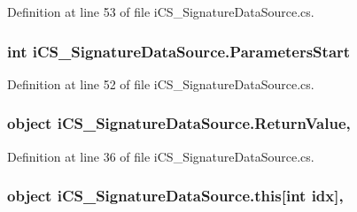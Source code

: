 Definition at line 53 of file i\+C\+S\+\_\+\+Signature\+Data\+Source.\+cs.

\hypertarget{classi_c_s___signature_data_source_a6a966657131abc59eea5c3d78625abd3}{
\subsubsection[{Parameters\+Start}]{\setlength{\rightskip}{0pt plus 5cm}int i\+C\+S\+\_\+\+Signature\+Data\+Source.\+Parameters\+Start\hspace{0.3cm}{\ttfamily [get]}}}\label{classi_c_s___signature_data_source_a6a966657131abc59eea5c3d78625abd3}


Definition at line 52 of file i\+C\+S\+\_\+\+Signature\+Data\+Source.\+cs.

\hypertarget{classi_c_s___signature_data_source_a7bfc30f7572a67fee813e2e4f779a41f}{
\subsubsection[{Return\+Value}]{\setlength{\rightskip}{0pt plus 5cm}object i\+C\+S\+\_\+\+Signature\+Data\+Source.\+Return\+Value\hspace{0.3cm}{\ttfamily [get]}, {\ttfamily [set]}}}\label{classi_c_s___signature_data_source_a7bfc30f7572a67fee813e2e4f779a41f}


Definition at line 36 of file i\+C\+S\+\_\+\+Signature\+Data\+Source.\+cs.

\hypertarget{classi_c_s___signature_data_source_a5f9ac11fb491603b4e1947467f5d1bae}{
\subsubsection[{this[int idx]}]{\setlength{\rightskip}{0pt plus 5cm}object i\+C\+S\+\_\+\+Signature\+Data\+Source.\+this\mbox{[}int idx\mbox{]}\hspace{0.3cm}{\ttfamily [get]}, {\ttfamily [set]}}}\label{classi_c_s___signature_data_source_a5f9ac11fb491603b4e1947467f5d1bae}


